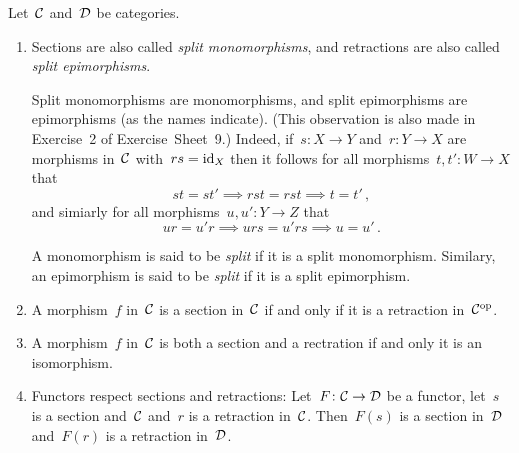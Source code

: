 \begin{remark*}
  Let~$\mathcal{C}$ and~$\mathcal{D}$ be categories.
  \begin{enumerate}
    \item
      Sections are also called \emph{split monomorphisms}, and retractions are also called \emph{split epimorphisms}.
  
      Split monomorphisms are monomorphisms, and split epimorphisms are epimorphisms (as the names indicate).
      (This observation is also made in Exercise~2 of Exercise~Sheet~9.)
      Indeed, if~$s \colon X \to Y$ and~$r \colon Y \to X$ are morphisms in~$\mathcal{C}$ with~$rs = \operatorname{id}_X$ then it follows for all morphisms~$t, t' \colon W \to X$ that
      \[
        st = st'
        \implies
        rst = rst
        \implies
        t = t' \,,
      \]
      and simiarly for all morphisms~$u, u' \colon Y \to Z$ that
      \[
        ur = u'r
        \implies
        urs = u'rs
        \implies
        u = u'  \,.
      \]
      
      A monomorphism is said to be \emph{split} if it is a split monomorphism.
      Similary, an epimorphism is said to be \emph{split} if it is a split epimorphism.
    \item
      A morphism~$f$ in~$\mathcal{C}$ is a section in~$\mathcal{C}$ if and only if it is a retraction in~$\mathcal{C}^{\mathrm{op}}$.
    \item
      A morphism~$f$ in~$\mathcal{C}$ is both a section and a rectration if and only it is an isomorphism.
    \item
      Functors respect sections and retractions:
      Let~$F \colon \mathcal{C} \to \mathcal{D}$ be a functor, let~$s$ is a section and~$\mathcal{C}$ and~$r$ is a retraction in~$\mathcal{C}$.
      Then~$F(s)$ is a section in~$\mathcal{D}$ and~$F(r)$ is a retraction in~$\mathcal{D}$.
  \end{enumerate}
\end{remark*}



